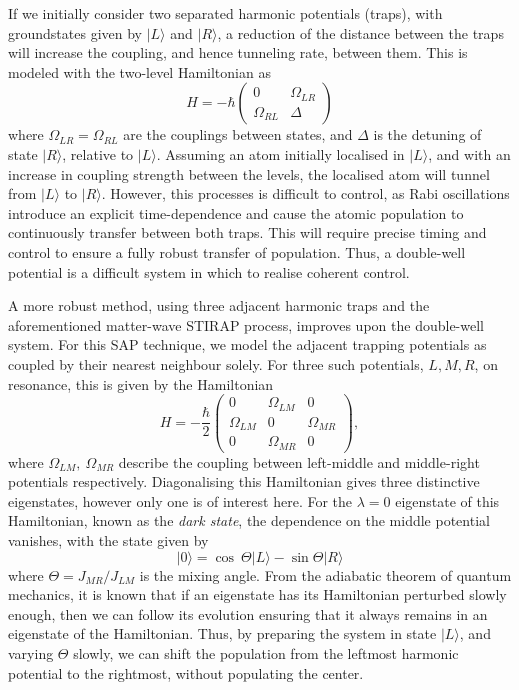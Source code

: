 If we initially consider two separated harmonic potentials (traps), with groundstates given by $| L \rangle$ and $| R \rangle$, a reduction of the distance between the traps will increase the coupling, and hence tunneling rate, between them. This is modeled with the two-level Hamiltonian as
\begin{equation}
    H = -\hbar
    \begin{pmatrix}
        0 & \Omega_{LR} \\
        \Omega_{RL} & \Delta
    \end{pmatrix}
\end{equation}
where $\Omega_{LR} = \Omega_{RL}$ are the couplings between states, and $\Delta$ is the detuning of state $| R \rangle$, relative to $| L \rangle$. Assuming an atom initially localised in $| L \rangle$, and with an increase in coupling strength between the levels, the localised atom will tunnel from $| L \rangle$ to $| R \rangle $. However, this processes is difficult to control, as Rabi oscillations introduce an explicit time-dependence and cause the atomic population to continuously transfer between both traps. This will require precise timing and control to ensure a fully robust transfer of population. Thus, a double-well potential is a difficult system in which to realise coherent control.

A more robust method, using three adjacent harmonic traps and the aforementioned matter-wave STIRAP process, improves upon the double-well system. For this SAP technique, we model the adjacent trapping potentials as coupled by their nearest neighbour solely. For three such potentials, $L,M,R$, on resonance,  this is given by the Hamiltonian
\begin{equation}\label{eqn:sap_ham}
    H = -\frac{\hbar}{2}
    \begin{pmatrix}
        0 & \Omega_{LM} & 0 \\
        \Omega_{LM} & 0 & \Omega_{MR} \\
        0 & \Omega_{MR} & 0
    \end{pmatrix},
\end{equation}
where $\Omega_{LM},~\Omega_{MR}$ describe the coupling between left-middle and middle-right potentials respectively. Diagonalising this Hamiltonian gives three distinctive eigenstates, however only one is of interest here. For the $\lambda=0$ eigenstate of this Hamiltonian, known as the \textit{dark state}, the dependence on the middle potential vanishes, with the state given by
\begin{equation}
 | 0 \rangle = \cos\ \Theta| L \rangle - \sin \Theta | R \rangle
\end{equation}
where $\Theta=J_{MR}/J_{LM}$ is the mixing angle. From the adiabatic theorem of quantum mechanics, it is known that if an eigenstate has its Hamiltonian perturbed slowly enough, then we can follow its evolution ensuring that it always remains in an eigenstate of the Hamiltonian. Thus, by preparing the system in state $| L \rangle$, and varying $\Theta$ slowly, we can shift the population from the leftmost harmonic potential to the rightmost, without populating the center.

